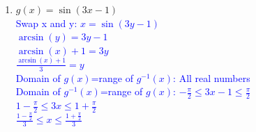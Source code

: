 \documentclass{ximera}
\begin{document}
\begin{exercise}
\begin{enumerate}
    \item $g(x)=\sin(3x-1)$\\
    \textcolor{blue}{ Swap x and y: $x=\sin(3y-1)$\\
    $\arcsin(y)=3y-1$\\
    $\arcsin(x)+1=3y$\\
    $\frac{\arcsin(x)+1}{3}=y$\\
    Domain of $g(x)$=range of $g^{-1}(x)$: All real numbers\\
    Domain of $g^{-1}(x)$=range of $g(x)$: $-\frac{\pi}{2}\leq 3x-1\leq \frac{\pi}{2}$\\
    $1-\frac{\pi}{2}\leq 3x\leq 1+\frac{\pi}{2}$ \\
    $\frac{1-\frac{\pi}{2}}{3}\leq x\leq  \frac{1+\frac{\pi}{2}}{3}$ }
    \end{enumerate}
\end{exercise}
\end{document}
